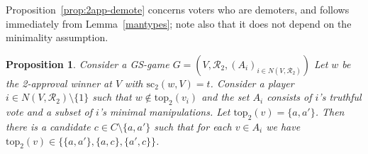\documentclass[11pt]{article}
\newtheorem{proposition}{Proposition}
\newcommand{\calR}{\mathcal{R}}
\newcommand{\tp}{\mathrm{top}}
\newcommand{\scr}{\mathrm{sc}}
\begin{document}
\iffalse
\begin{proof}
Since $i$ is a GS-manipulator, he does not rank $w$ first;
therefore, he ranks $w$ second. 
Then the only way for him to improve the outcome 
is to vote so that his top candidate $p = \tp(v_i)$ wins. 
For this $i$ must demote $w$ and promote a candidate $c$ which will not overtake $p$, 
i.e., $i$ is necessarily a demoter.
Moreover, it must be the case that $p$ beats every candidate in $C\setminus\{w\}$ at $V$.
Thus, $i$ can manipulate in favour of  $p = \tp(v_i)$  only if
$S(V, 2)\neq\emptyset$ and $p=p^*(V,2)$, and
%
every non-truthful strategy in $A_i$
is of the form $v_i[w;c]$ %
for some $c\not\in\tp_2(v)$. Thus, 
$p\in \cap_{v\in A_i}\tp_2(v)$, which proves our claim. 
\end{proof}
\fi

Proposition~\ref{prop:2app-demote} 
concerns voters who are demoters, and follows immediately
from Lemma~\ref{mantypes}; note also that it does not depend on the minimality assumption.

\begin{proposition}\label{prop:2app-promote}
Consider a GS-game $G=(V, \calR_2, (A_i)_{i\in N(V, \calR_2)})$
Let $w$ be the 2-approval winner at $V$ with $\scr_2(w, V)=t$.
Consider a player $i\in N(V, \calR_2)\setminus\{1\}$ 
such that $w\not\in\tp_2(v_i)$ and the set $A_i$ consists of $i$'s truthful vote 
and a subset of $i$'s minimal manipulations.
Let $\tp_2(v) = \{a, a'\}$.
Then there is a candidate $c\in C\setminus\{a, a'\}$
such that for each $v\in A_i$ we have $\tp_2(v)\in\{\{a, a'\}, \{a, c\}, \{a',c\}\}$. 
\end{proposition}
\end{document}
